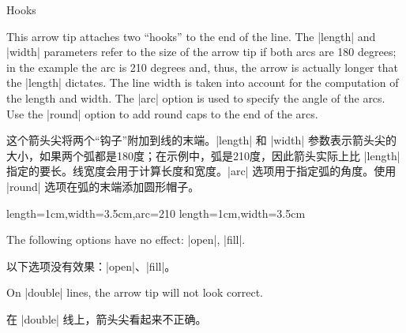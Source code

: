 \begin{arrowtip}{Hooks}{
    This arrow tip attaches two ``hooks'' to the end of the line. The |length|
    and |width| parameters refer to the size of the arrow tip if both arcs are
    180 degrees; in the example the arc is 210 degrees and, thus, the arrow is
    actually longer that the |length| dictates. The line width is taken into
    account for the computation of the length and width. The |arc| option is
    used to specify the angle of the arcs. Use the |round| option to add round
    caps to the end of the arcs.

    这个箭头尖将两个“钩子”附加到线的末端。|length| 和 |width| 参数表示箭头尖的大小，如果两个弧都是180度；在示例中，弧是210度，因此箭头实际上比 |length| 指定的要长。线宽度会用于计算长度和宽度。|arc| 选项用于指定弧的角度。使用 |round| 选项在弧的末端添加圆形帽子。
    
}%
{length=1cm,width=3.5cm,arc=210}%
{length=1cm,width=3.5cm}

    \begin{arrowexamples}
        \arrowexample[]
        \arrowexampledup[sep]
        \arrowexampledupdot[sep]
        \arrowexample[arc=120]
        \arrowexample[arc=270]
        \arrowexample[length=2pt]
        \arrowexample[length=2pt,width=5pt]
        \arrowexample[line width=2pt]
        \arrowexample[reversed]
        \arrowexample[round]
        \arrowexample[slant=.3]
        \arrowexample[left]
        \arrowexample[right]
        \arrowexample[red]
    \end{arrowexamples}
    The following options have no effect: |open|, |fill|.

    以下选项没有效果：|open|、|fill|。


    On |double| lines, the arrow tip will not look correct.

    在 |double| 线上，箭头尖看起来不正确。


\end{arrowtip}

